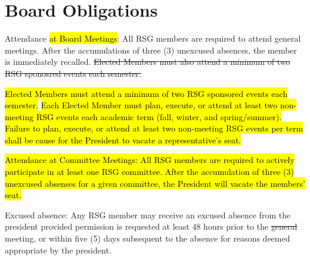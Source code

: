 \begin{enumsubsection}
\begin{enumsubsubsection}
\end{enumsubsubsection}
\end{enumsubsection}

\section{Board Obligations}
\begin{enumsubsection}
\itemnotoc Attendance \hl{at Board Meetings}: All RSG members are required to attend general meetings. 
After the accumulations of three (3) unexcused absences, the member is 
immediately recalled. \st{Elected Members must also attend a minimum of two RSG sponosred events each semester.}

\itemnotoc \hl{Elected Members must  attend a minimum of two RSG sponsored events each semester.} \hl{Each Elected Member must plan, execute, or attend at least two non-meeting RSG events each academic term (fall, winter, and 
spring/summer). Failure to plan, execute, or attend at least two non-meeting RSG events per term shall be cause for the President to vacate a 
representative's seat.}

\itemnotoc \hl{Attendance at Committee Meetings: All RSG members are required to actively participate in at least one RSG committee. After the accumulation of three (3) unexcused absenses for a given committee, the President will vacate the members' seat.} 


\itemnotoc Excused absence: Any RSG member may receive an excused absence 
from the president provided permission is requested at least 48 hours prior 
to the \st{general} meeting, or within five (5) days subsequent to the absence for reasons deemed appropriate by the president.
\end{enumsubsection}
